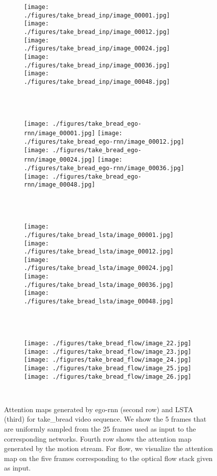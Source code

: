 \documentclass[10pt,twocolumn,letterpaper]{article}
\begin{document}
\begin{figure*}[t]
	\centering      
	\begin{subfigure}[b]{0.95\textwidth}
		\texttt{[image: ./figures/take\_bread\_inp/image\_00001.jpg]}
		\texttt{[image: ./figures/take\_bread\_inp/image\_00012.jpg]}
		\texttt{[image: ./figures/take\_bread\_inp/image\_00024.jpg]}
		\texttt{[image: ./figures/take\_bread\_inp/image\_00036.jpg]}
		\texttt{[image: ./figures/take\_bread\_inp/image\_00048.jpg]}
	\end{subfigure}\\ \vskip 2mm
	\ 
	\begin{subfigure}[b]{0.95\textwidth}
		\texttt{[image: ./figures/take\_bread\_ego-rnn/image\_00001.jpg]}
		\texttt{[image: ./figures/take\_bread\_ego-rnn/image\_00012.jpg]}
		\texttt{[image: ./figures/take\_bread\_ego-rnn/image\_00024.jpg]}
		\texttt{[image: ./figures/take\_bread\_ego-rnn/image\_00036.jpg]}
		\texttt{[image: ./figures/take\_bread\_ego-rnn/image\_00048.jpg]}
	\end{subfigure}\\ \vskip 2mm
	\ 
	\begin{subfigure}[b]{0.95\textwidth}
		\texttt{[image: ./figures/take\_bread\_lsta/image\_00001.jpg]}
		\texttt{[image: ./figures/take\_bread\_lsta/image\_00012.jpg]}
		\texttt{[image: ./figures/take\_bread\_lsta/image\_00024.jpg]}
		\texttt{[image: ./figures/take\_bread\_lsta/image\_00036.jpg]}
		\texttt{[image: ./figures/take\_bread\_lsta/image\_00048.jpg]}
	\end{subfigure}\\ \vskip 2mm	       
	\ 
	\begin{subfigure}[b]{0.95\textwidth}
		\texttt{[image: ./figures/take\_bread\_flow/image\_22.jpg]}
		\texttt{[image: ./figures/take\_bread\_flow/image\_23.jpg]}
		\texttt{[image: ./figures/take\_bread\_flow/image\_24.jpg]}
		\texttt{[image: ./figures/take\_bread\_flow/image\_25.jpg]}
		\texttt{[image: ./figures/take\_bread\_flow/image\_26.jpg]}
	\end{subfigure}\\ \vskip 2mm			 
	\caption{Attention maps generated by ego-rnn (second row) and LSTA (third) for take\_bread video sequence. We show the 5 frames that are uniformly sampled from the 25 frames used as input to the corresponding networks. Fourth row shows the attention map generated by the motion stream. For flow, we visualize the attention map on the five frames corresponding to the optical flow stack given as input.}
	\label{fig:att_map_take_bread}
\end{figure*}
\end{document}
